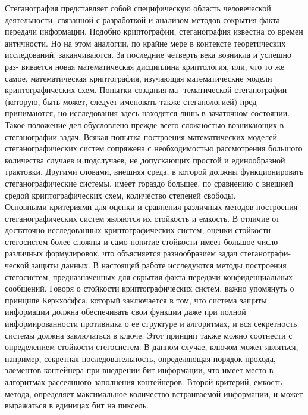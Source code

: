 ﻿\documentclass[a4paper,12pt]{article}
\theoremstyle{plain}
\begin{document}
Стеганография представляет собой специфическую область человеческой деятельности, связанной с
разработкой и анализом методов сокрытия факта передачи информации. Подобно криптографии,
стеганография известна со времен античности. Но на этом аналогии, по крайне мере в контексте
теоретических исследований, заканчиваются. За последние четверть века возникла и успешно раз-
вивается новая математическая дисциплина криптология, или, что то же самое, математическая
криптография, изучающая математические модели криптографических схем. Попытки создания ма-
тематической стеганографии (которую, быть может, следует именовать также стеганологией) пред-
принимаются, но исследования здесь находятся лишь в зачаточном состоянии.\\
Такое положение дел обусловлено прежде всего сложностью возникающих в стеганографии задач. Всякая попытка построения математических моделей стеганографических систем сопряжена с
необходимостью рассмотрения большого количества случаев и подслучаев, не допускающих простой
и единообразной трактовки. Другими словами, внешняя среда, в которой должны функционировать
стеганографические системы, имеет гораздо большее, по сравнению с внешней средой криптографических схем, количество степеней свободы.\\
Основными критериями для оценки и сравнения различных методов построения стеганографических систем являются их стойкость и емкость. В отличие от достаточно исследованных криптографических систем, оценки стойкости стегосистем более сложны и само понятие стойкости имеет большое число различных формулировок, что объясняется разнообразием задач стеганографи-ческой защиты данных. В настоящей работе исследуются методы построения стегосистем, предназначенных для скрытия факта передачи конфиденциальных сообщений. Говоря о стойкости криптографических систем, важно упомянуть о принципе Керкхоффса, который заключается в том, что система защиты информации должна обеспечивать свои функции даже при полной информированности противника о ее структуре и алгоритмах, и вся секретность системы должна заключаться в ключе. Этот принцип также можно соотнести с определением стойкости стегосистем. В данном случае, ключом может являться, например, секретная последовательность, определяющая порядок прохода, элементов контейнера при внедрении бит информации, что имеет место в алгоритмах рассеянного заполнения контейнеров. Второй критерий, емкость метода, определяет максимальное количество встраиваемой информации, и может выражаться в единицах бит на пиксель.


\newpage
\end{document}
